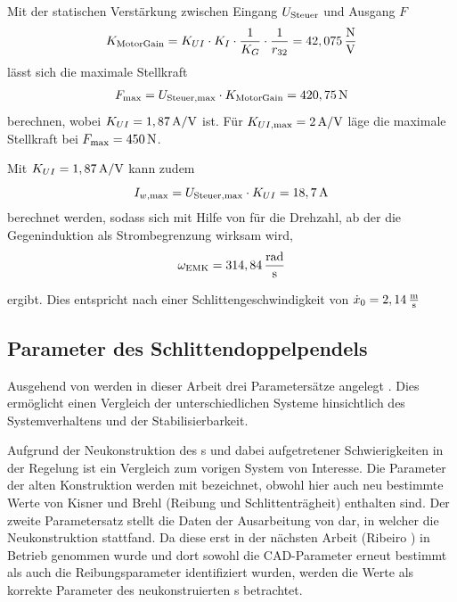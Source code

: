 Mit der statischen Verstärkung zwischen Eingang $U_{\mathrm{Steuer}}$ und Ausgang $F$
\begin{align}
	K_{\mathrm{MotorGain}} = K_{UI} \cdot K_I \cdot \frac{1}{K_G} \cdot \frac{1}{r_{32}} = 42,075\,\mathrm{\frac{N}{V}}
	\label{eq:motgain}
\end{align}
lässt sich die maximale Stellkraft
\begin{align}
	F_{\mathrm{max}} = U_{\mathrm{Steuer, max}} \cdot K_{\mathrm{MotorGain}} = 420,75\,\mathrm{N}
\end{align}
berechnen, wobei $K_{UI} = 1,87\,\mathrm{A/V}$ ist.
Für $K_{UI \mathrm{, max}} = 2\,\mathrm{A/V}$ läge die maximale Stellkraft bei $F_{\mathrm{max}} = 450\,\mathrm{N}$.

Mit $K_{UI} = 1,87\,\mathrm{A/V}$ kann zudem
\[
	I_{w\mathrm{, max}} = U_{\mathrm{Steuer, max}} \cdot K_{UI} = 18,7\,\mathrm{A} 
\]
berechnet werden, sodass sich mit Hilfe von  für die Drehzahl, ab der die Gegeninduktion als Strombegrenzung wirksam wird,
\[
	\omega_{\mathrm{EMK}} = 314,84\,\mathrm{\frac{rad}{s}}
\]

ergibt. Dies entspricht nach  einer Schlittengeschwindigkeit von $\dot{x}_0 = 2,14\,\mathrm{\frac{m}{s}}$ 



\subsection{Parameter des Schlittendoppelpendels}\label{subsec:spdparams}

Ausgehend von  werden in dieser Arbeit drei Parametersätze angelegt .
Dies ermöglicht einen Vergleich der unterschiedlichen Systeme hinsichtlich des Systemverhaltens und der Stabilisierbarkeit.

Aufgrund der Neukonstruktion des \dpd s und dabei aufgetretener Schwierigkeiten in der Regelung ist ein Vergleich zum vorigen System von Interesse.
Die Parameter der alten Konstruktion werden mit  bezeichnet, obwohl hier auch neu bestimmte Werte von Kisner \cite{kisner} und Brehl \cite{brehl} (Reibung und Schlittenträgheit) enthalten sind.
Der zweite Parametersatz  stellt die Daten der Ausarbeitung von \cite{chang} dar, in welcher die Neukonstruktion stattfand. 
Da diese erst in der nächsten Arbeit (Ribeiro \cite{ribeiro}) in Betrieb genommen wurde und dort sowohl die CAD-Parameter erneut bestimmt als auch die Reibungsparameter identifiziert wurden, werden die Werte  als korrekte Parameter des neukonstruierten \dpd s betrachtet.

